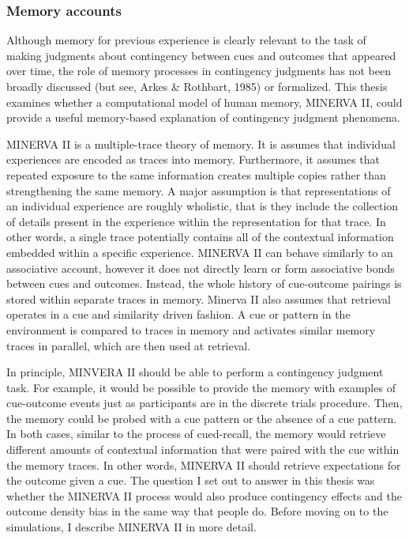 \documentclass[
  english,
  man,floatsintext]{apa6}
\begin{document}
\hypertarget{memory-accounts}{%
\subsubsection{Memory accounts}\label{memory-accounts}}

Although memory for previous experience is clearly relevant to the task of making judgments about contingency between cues and outcomes that appeared over time, the role of memory processes in contingency judgments has not been broadly discussed (but see, Arkes \& Rothbart, 1985) or formalized. This thesis examines whether a computational model of human memory, MINERVA II, could provide a useful memory-based explanation of contingency judgment phenomena.

MINERVA II is a multiple-trace theory of memory. It is assumes that individual experiences are encoded as traces into memory. Furthermore, it assumes that repeated exposure to the same information creates multiple copies rather than strengthening the same memory. A major assumption is that representations of an individual experience are roughly wholistic, that is they include the collection of details present in the experience within the representation for that trace. In other words, a single trace potentially contains all of the contextual information embedded within a specific experience. MINERVA II can behave similarly to an associative account, however it does not directly learn or form associative bonds between cues and outcomes. Instead, the whole history of cue-outcome pairings is stored within separate traces in memory. Minerva II also assumes that retrieval operates in a cue and similarity driven fashion. A cue or pattern in the environment is compared to traces in memory and activates similar memory traces in parallel, which are then used at retrieval.

In principle, MINVERA II should be able to perform a contingency judgment task. For example, it would be possible to provide the memory with examples of cue-outcome events just as participants are in the discrete trials procedure. Then, the memory could be probed with a cue pattern or the absence of a cue pattern. In both cases, similar to the process of cued-recall, the memory would retrieve different amounts of contextual information that were paired with the cue within the memory traces. In other words, MINERVA II should retrieve expectations for the outcome given a cue. The question I set out to answer in this thesis was whether the MINERVA II process would also produce contingency effects and the outcome density bias in the same way that people do. Before moving on to the simulations, I describe MINERVA II in more detail.
\end{document}

